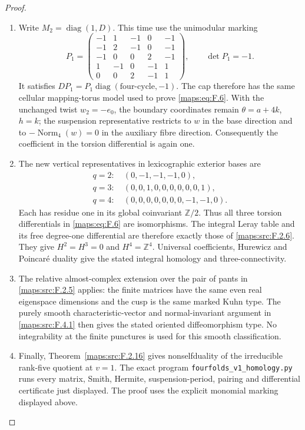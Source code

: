\begin{proof}
\begin{enumerate}[label={$\langle1\rangle$\arabic*.}]
\item Write $M_2=\operatorname{diag}(1,D)$.  This time use the
unimodular marking
\[
 P_1=\begin{pmatrix}
 -1&1&-1&0&-1\\
 -1&2&-1&0&-1\\
 -1&0&0&2&-1\\
 1&-1&0&-1&1\\
 0&0&2&-1&1
 \end{pmatrix},\qquad \det P_1=-1.
\]
It satisfies $DP_1=P_1\operatorname{diag}(\text{four-cycle},-1)$.
The cap therefore has the same cellular mapping-torus model
used to prove \eqref{maps:eq:F.6}.  With the unchanged twist $w_2=-e_0$,
the boundary coordinates remain $\theta=a+4k$, $h=k$;
the suspension representative restricts to $w$ in the base
direction and to $-\operatorname{Norm}_4(w)=0$ in the
auxiliary fibre direction.  Consequently the coefficient in
the torsion differential is again one.

\item The new vertical representatives in lexicographic exterior
bases are
\[
\begin{split}
 q=2:\ &(0,-1,-1,-1,0),\\
 q=3:\ &(0,0,1,0,0,0,0,0,0,1),\\
 q=4:\ &(0,0,0,0,0,0,0,-1,-1,0).
\end{split}
\]
Each has residue one in its global coinvariant
$\mathbb Z/2$.  Thus all three torsion differentials in \eqref{maps:eq:F.6}
are isomorphisms.  The integral Leray table and its free
degree-one differential are therefore exactly those of
\ref{maps:src:F.2.6}.  They give $H^2=H^3=0$ and $H^4=\mathbb Z^4$.
Universal coefficients, Hurewicz and Poincar\'e duality give
the stated integral homology and three-connectivity.

\item The relative almost-complex extension over the pair of pants
in \ref{maps:src:F.2.5} applies: the finite matrices have the same even
real eigenspace dimensions and the cusp is the same marked
Kuhn type.  The purely smooth characteristic-vector and
normal-invariant argument in \ref{maps:src:F.4.1} then gives the stated
oriented diffeomorphism type.  No integrability at the finite
punctures is used for this smooth classification.

\item Finally, Theorem~\ref{maps:src:F.2.16} gives nonselfduality of the irreducible rank-five quotient at $v=1$.
The exact program
\texttt{fourfolds\_v1\_homology.py} runs every matrix,
Smith, Hermite, suspension-period, pairing and differential
certificate just displayed.  The proof uses the explicit monomial marking displayed above.

\end{enumerate}
\end{proof}




